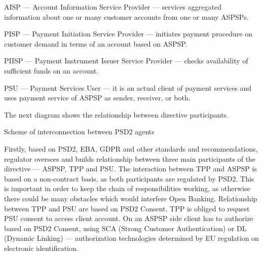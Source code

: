 AISP — Account Information Service Provider — services aggregated information about one or many customer accounts from one or many ASPSPs.

PISP — Payment Initiation Service Provider — initiates payment procedure on customer demand in terms of an account based on ASPSP.

PIISP — Payment Instrument Issuer Service Provider — checks availability of sufficient funds on an account.

PSU — Payment Services User — it is an actual client of payment services and uses payment service of ASPSP as sender, receiver, or both.

The next diagram shows the relationship between directive participants.

\begin{table}
\centering
\caption{Scheme of interconnection between PSD2 agents}
\medskip
{}
\end{table}

Firstly, based on PSD2, EBA, GDPR and other standards and recommendations, regulator oversees and builds relationship between three main participants of the directive — ASPSP, TPP and PSU.
The interaction between TPP and ASPSP is based on a non-contract basis, as both participants are regulated by PSD2.
This is important in order to keep the chain of responsibilities working, as otherwise there could be many obstacles which would interfere Open Banking.
Relationship between TPP and PSU are based on PSD2 Consent.
TPP is obliged to request PSU consent to access client account.
On an ASPSP side client has to authorize based on PSD2 Consent, using SCA (Strong Customer Authentication) or DL (Dynamic Linking) — authorization technologies determined by EU regulation on electronic identification.

